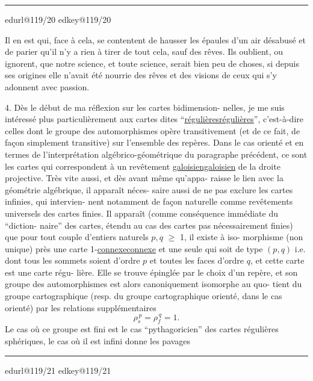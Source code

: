\documentclass[11pt,a4paper]{article}
\makeatletter
\newif\ifreading
\newif\ifenglish
\def\CurrentScanURL{}
\def\CurrentPageKey{}
\def\CurrentApparatus{}
\newcommand{\scanpage}[1]{%
  \clearpage
  \expandafter\let\expandafter\CurrentScanURL\csname edurl@#1\endcsname
  \expandafter\let\expandafter\CurrentPageKey\csname edkey@#1\endcsname
  \def\CurrentApparatus{}%
  \hypertarget{scan-\CurrentPageKey}{}%
  \typeout{EDITION-SCAN: \CurrentPageKey; PDFPAGE: \the\numexpr\ReadonlyShipoutCounter+1\relax}%
  \ifreading
    \marginnote{\raggedright\scriptsize\sffamily\href{\CurrentScanURL}{119 / \csname edpage@#1\endcsname}}%
  \else
    \noindent{\small\sffamily\href{\CurrentScanURL}{[scan #1]}}\par\smallskip
  \fi}
\newcommand{\mspage}[1]{%
  \ifreading\marginnote{\raggedright\scriptsize\sffamily p.\,#1}[2\baselineskip]%
  \else\noindent{\small\sffamily[p.\,#1]}\par\smallskip\fi}
\let\TextUline\uline
\renewcommand{\uline}[1]{\ifmmode\underline{#1}\else\TextUline{#1}\fi}
\newcommand{\margin}[1]{%
  \sbox{\MarginalTestBox}{\parbox{\marginparwidth}{\raggedright\footnotesize#1}}%
  \ifdim\dimexpr\ht\MarginalTestBox+\dp\MarginalTestBox\relax>3\baselineskip
    \par\smallskip\noindent\begin{minipage}{\linewidth}\hrule\smallskip
    {\footnotesize\textcolor{HandInk}{\ifenglish Marginal note:\else Note marginale :\fi\ #1}}\smallskip\hrule\end{minipage}\par\smallskip
  \else
    \marginnote{\raggedright\footnotesize\textcolor{HandInk}{#1}}%
  \fi}
\newcommand{\finishscan}{\ifx\CurrentApparatus\empty\else\par\bigskip\noindent\rule{.35\linewidth}{.35pt}\par\smallskip{\footnotesize\setlength{\parskip}{3pt}\CurrentApparatus}\fi}
\makeatother
\begin{document}
\finishscan
\scanpage{119/20}
\mspage{18}

Il en est qui, face à cela, se contentent de hausser les
épaules d'un air  désabusé et de parier qu'il n'y a rien à tirer
de tout cela, sauf des rêves. Ils oublient, ou ignorent, que notre
science, et toute science, serait bien peu  de choses, si depuis
ses origines elle n'avait été nourrie des rêves et des visions
de ceux qui s'y adonnent avec passion.

4.        Dès le début de ma réflexion sur les cartes bidimension-%
nelles, je me suis intéressé plus particulièrement aux cartes dites
``\uline{régulières}'', c'est-à-dire celles dont le groupe des automorphismes
opère transitivement (et de ce fait, de façon simplement transitive)
sur l'ensemble des repères. Dans le cas orienté et en termes de
l'interprétation algébrico-géométrique du paragraphe précédent,
ce sont les cartes qui correspondent à un revêtement \uline{galoisien} de
la droite projective. Très vite aussi, et dès avant même qu'appa-%
raisse le lien avec la géométrie algébrique, il apparaît néces-%
saire aussi de ne pas exclure les cartes infinies, qui intervien-%
nent notamment de façon naturelle comme revêtements universels des
cartes finies. Il apparaît (comme conséquence immédiate du ``diction-%
naire'' des cartes, étendu au cas des cartes pas nécessairement finies)
que pour tout couple d'entiers naturels  $p, q$ $\geq$ 1, il existe à iso-%
morphisme (non unique) près une carte 1-\uline{connexe} et une seule qui
soit de type  $(p,q)$  i.e. dont tous les sommets soient d'ordre  $p$
et toutes les faces d'ordre  $q$, et cette carte est une carte régu-%
lière. Elle se trouve épinglée par le choix d'un repère, et son
groupe des automorphismes est alors canoniquement isomorphe au quo-%
tient du groupe cartographique (resp. du groupe cartographique
orienté, dans le cas orienté) par les relations supplémentaires
\[ \rho_s^{\,p} = \rho_f^{\,q} = 1. \]
Le cas où ce groupe est fini est le cas ``pythagoricien'' des cartes
régulières sphériques, le cas où il est infini donne les pavages

\margin{20}

\finishscan
\scanpage{119/21}
\mspage{19}
\end{document}
